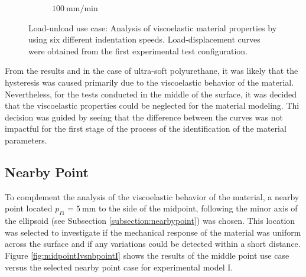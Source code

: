 \begin{figure}[htbp]
\begin{subfigure}[b]{0.45\textwidth}
    \end{subfigure}
    \hspace{0.3cm}
    \begin{subfigure}[b]{0.45\textwidth}
    \centering
    \caption{$\SI[per-mode = symbol]{100}{\milli \m\per \minute}$}
    \end{subfigure}
    
    \caption[Load-unload use case: Analysis of Viscoelasticity]{Load-unload use case: Analysis of viscoelastic material properties by using six different indentation speeds. Load-displacement curves were obtained from the first experimental test configuration.}
    \label{fig:ludifspeed}
    \end{figure}

From the results and in the case of ultra-soft polyurethane, it was likely that the hysteresis was caused 
primarily due to the viscoelastic behavior of the material. Nevertheless, for the 
tests conducted in the middle of the surface, it was decided that the viscoelastic properties 
could be neglected for the material modeling. Thi decision was guided by seeing that the difference between the curves 
was not impactful for the first stage of the process of the identification of the material parameters.



\subsection{Nearby Point}
\label{subsection:nearbypointresult}
To complement the analysis of the viscoelastic behavior of the material,
a nearby point located $p_{I1} = \SI{5}{\milli \m}$ to the side of the midpoint,
following the minor axis of the ellipsoid (see Subsection \ref{subsection:nearbypoint}) was chosen. 
This location was selected to investigate if the mechanical response of the material 
was uniform across the surface and if any variations could be detected within 
a short distance. Figure \ref{fig:midpointIvsnbpointI} shows the results of the 
middle point use case versus the selected nearby point case for experimental model I. 

